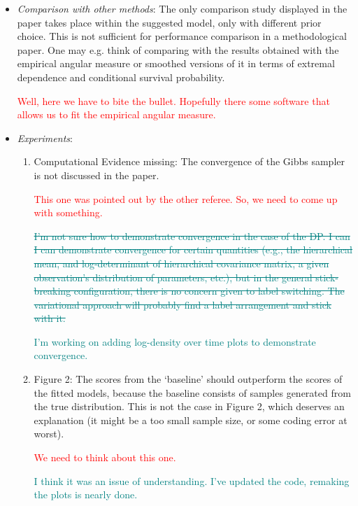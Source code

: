\documentclass[10pt]{article}
\newcommand{\comment}[1]{\textcolor{teal}{#1}}
\newcommand{\bruno}[1]{\textcolor{red}{#1}}
\begin{document}
\begin{itemize}
    \item \emph{Comparison with other methods}: The only comparison study displayed in the paper 
    takes place within the suggested model, only with different prior choice. This is not sufficient 
    for performance comparison in a methodological paper. One may e.g. think of comparing with the
    results obtained with the empirical angular measure or smoothed versions of it in terms of 
    extremal dependence and conditional survival probability.

    \bruno{Well, here we have to bite the bullet. Hopefully there some software that allows us
    to fit the empirical angular measure.}

    \item \emph{Experiments}:
        \begin{enumerate}
            \item Computational Evidence missing: The convergence of the Gibbs sampler is not 
            discussed in the paper.

            \bruno{This one was pointed out by the other referee. So, we need to come up with something.}

            \comment{\st{I'm not sure how to demonstrate convergence in the case of the DP.  I can
            I can demonstrate convergence for certain quantities (e.g., the hierarchical mean,
            and log-determinant of hierarchical covariance matrix, a given observation's distribution
            of parameters, etc.), but in the general stick-breaking configuration, there is no concern
            given to label switching.  The variational approach will probably find a label arrangement
            and stick with it.}}

            \comment{I'm working on adding log-density over time plots to demonstrate convergence.}
            
            \item Figure 2: The scores from the ‘baseline’ should outperform the scores of
            the fitted models, because the baseline consists of samples generated from the 
            true distribution. This is not the case in Figure 2, which deserves an explanation 
            (it might be a too small sample size, or some coding error at worst).

            \bruno{We need to think about this one.}

            \comment{I think it was an issue of understanding.  I've updated the code, remaking the plots
            is nearly done.}


\end{enumerate}
\end{itemize}
\end{document}

